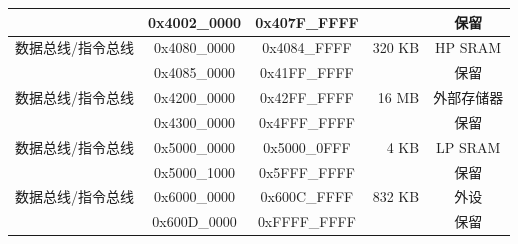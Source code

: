 \begin{ThreePartTable}
\begin{longtable}[c]{|p{3.5cm}|c|c|r|c| }
        \rowcolor{gray!25}  & 0x4002\_0000 & 0x407F\_FFFF &         & 保留      \\\hline
        {数据总线/指令总线} & 0x4080\_0000 & 0x4084\_FFFF & 320 KB  & HP SRAM\tnote{*} \\\hline

        \hline

        \rowcolor{gray!25}  & 0x4085\_0000 & 0x41FF\_FFFF &         & 保留      \\\hline
        {数据总线/指令总线} & 0x4200\_0000 & 0x42FF\_FFFF & 16 MB & 外部存储器  \\\hline
        \rowcolor{gray!25}  & 0x4300\_0000 & 0x4FFF\_FFFF &         & 保留      \\\hline
        {数据总线/指令总线} & 0x5000\_0000 & 0x5000\_0FFF & 4 KB  & LP SRAM\tnote{*} \\\hline 
        \rowcolor{gray!25}  & 0x5000\_1000 & 0x5FFF\_FFFF &         & 保留      \\\hline
        {数据总线/指令总线} & 0x6000\_0000 & 0x600C\_FFFF & 832 KB  & 外设 \\\hline
        \rowcolor{gray!25}  & 0x600D\_0000 & 0xFFFF\_FFFF &         & 保留      \\\hline
        
\end{longtable}
\end{ThreePartTable}


